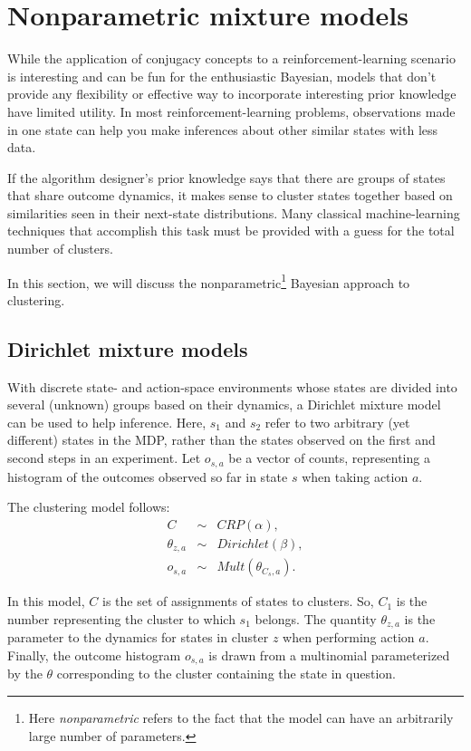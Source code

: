 \section{Nonparametric mixture models}
\label{models:npm}

While the application of conjugacy concepts to a reinforcement-learning scenario is interesting and can be fun for the enthusiastic Bayesian, models that don't provide any flexibility or effective way to incorporate interesting prior knowledge have limited utility. In most reinforcement-learning problems, observations made in one state can help you make inferences about other similar states with less data.

If the algorithm designer's prior knowledge says that there are groups of states that share outcome dynamics, it makes sense to cluster states together based on similarities seen in their next-state distributions. Many classical machine-learning techniques that accomplish this task must be provided with a guess for the total number of clusters.

In this section, we will discuss the nonparametric\footnote{Here \emph{nonparametric} refers to the fact that the model can have an arbitrarily large number of parameters.} Bayesian approach to clustering.

\subsection{Dirichlet mixture models}

With discrete state- and action-space environments whose states are divided into several (unknown) groups based on their dynamics, a Dirichlet mixture model can be used to help inference. Here, $s_1$ and $s_2$ refer to two arbitrary (yet different) states in the MDP, rather than the states observed on the first and second steps in an experiment. Let $o_{s,a}$ be a vector of counts, representing a histogram of the outcomes observed so far in state $s$ when taking action $a$.

The clustering model follows:
\begin{eqnarray}
C &\sim& CRP(\alpha),\\
\theta_{z,a} &\sim& Dirichlet(\beta),\\
o_{s,a} &\sim& Mult(\theta_{C_s,a}).
\end{eqnarray}

In this model, $C$ is the set of assignments of states to clusters. So, $C_1$ is the number representing the cluster to which $s_1$ belongs. The quantity $\theta_{z,a}$ is the parameter to the dynamics for states in cluster $z$ when performing action $a$. Finally, the outcome histogram $o_{s,a}$ is drawn from a multinomial parameterized by the $\theta$ corresponding to the cluster containing the state in question.

